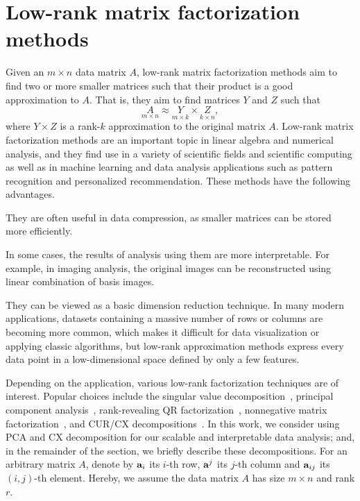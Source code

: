 \section{Low-rank matrix factorization methods}
\label{sxn:low-rank-methods}

Given an $m \times n$ data matrix $A$, low-rank matrix factorization methods aim to find two or more smaller matrices such that their product is a good approximation to $A$.
That is, they aim to find matrices $Y$ and $Z$ such that
\begin{equation}
 \label{eqn:apprx}
    \underset{m\times n}{A} \approx \underset{m\times k}{Y} \times \underset{k\times n}{Z} , 
\end{equation}
where $Y \times Z$ is a rank-$k$ approximation to the original matrix $A$.
Low-rank matrix factorization methods are an important topic in linear algebra and numerical analysis, and they find use in a variety of scientific fields and scientific computing as well as in machine learning and data analysis applications such as pattern recognition and personalized recommendation.
These methods have the following advantages.
\begin{compactitem}
\item
They are often useful in data compression, as smaller matrices can be stored more efficiently.
\item
In some cases, the results of analysis using them are more interpretable.
For example, in imaging analysis, the original images can be reconstructed using linear combination of basis images.
\item
They can be viewed as a basic dimension reduction technique.
In many modern applications, datasets containing a massive number of rows or columns are becoming more common, which makes it difficult for data visualization or applying classic algorithms, but low-rank approximation methods express every data point in a low-dimensional space defined by only a few features.
\end{compactitem}

Depending on the application, various low-rank factorization techniques are of interest. 
Popular choices include the singular value decomposition~\cite{GVL96}, principal component analysis~\cite{pcaBook}, rank-revealing QR factorization~\cite{GE96}, nonnegative matrix factorization~\cite{NMFalg}, and CUR/CX decompositions~\cite{CUR_PNAS}.
In this work, we consider using PCA and CX decomposition for our scalable and interpretable data analysis; and, in the remainder of the section, we briefly describe these decompositions.
For an arbitrary matrix $A$, denote by $\mathbf{a}_i$ its $i$-th row, $\mathbf{a}^j$ its $j$-th column and $\mathbf{a}_{ij}$ its $(i,j)$-th element. 
Hereby, we assume the data matrix $A$ has size $m \times n$ and rank $r$.


